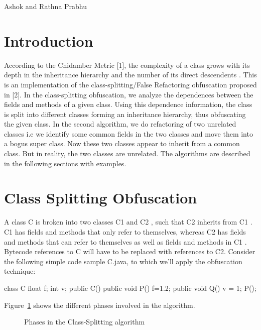 %
          {Ashok and Rathna Prabhu}

\section{Introduction}
According to the Chidamber Metric [1], the complexity of a class  grows with its depth in the inheritance hierarchy and the number of its direct descendents .
This is an implementation of the class-splitting/False Refactoring obfuscation proposed in [2]. In the class-splitting obfuscation, we analyze the dependences between the fields and methods of a given class. Using this dependence information, the class is split into different classes forming an inheritance hierarchy, thus obfuscating the given class. In the second algorithm, we do refactoring of two unrelated classes i.e we identify some common fields in the two classes and move them into a bogus super class. Now these two classes appear to inherit from a common class. But in reality, the two classes are unrelated. The algorithms are described in the following sections with examples.
\section{Class Splitting Obfuscation}
A class C is broken into two classes C1 and C2 ,
such that C2 inherits from C1 . C1 has fields and methods that
only refer to themselves, whereas C2 has fields and methods that
can refer to themselves as well as fields and methods in C1 .
Bytecode references to C will have to be replaced with references
to C2.
Consider the following simple code sample C.java, to which we'll apply the obfuscation technique:
\begin{listing}{1}
 class C {
  float f;
  int v;
  public C()  {  }
  public void P()
  {
   f=1.2;
  }
  public void Q()
  {
     v = 1;
     P();
  }
}
\end{listing}

Figure~\ref{phases} shows the different phases involved in the algorithm.
\begin{figure}
\begin{center}

\end{center}
\caption{Phases in the Class-Splitting algorithm}
\label{phases}
\end{figure}

